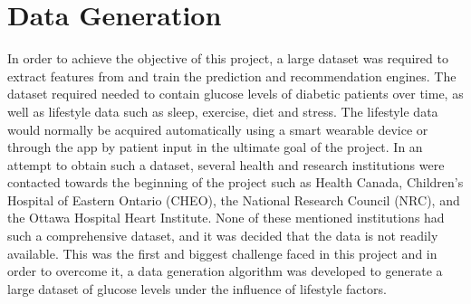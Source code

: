 
\section{Data Generation}
\label{sec:data_generation}

In order to achieve the objective of this project, a large dataset was required to extract features from and train the prediction and recommendation engines. The dataset required needed to contain glucose levels of diabetic patients over time, as well as lifestyle data such as sleep, exercise, diet and stress. The lifestyle data would normally be acquired automatically using a smart wearable device or through the app by patient input in the ultimate goal of the project. 
In an attempt to obtain such a dataset, several health and research institutions were contacted towards the beginning of the project such as Health Canada, Children's Hospital of Eastern Ontario (CHEO), the National Research Council (NRC), and the Ottawa Hospital Heart Institute. None of these mentioned institutions had such a comprehensive dataset, and it was decided that the data is not readily available. This was the first and biggest challenge faced in this project and in order to overcome it, a data generation algorithm was developed to generate a large dataset of glucose levels under the influence of lifestyle factors. 

